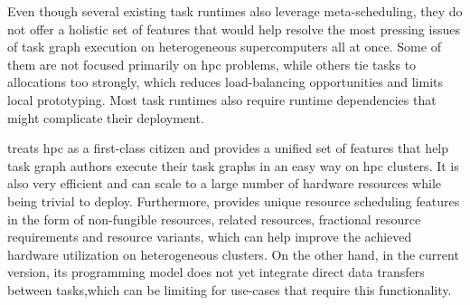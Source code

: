 Even though several existing task runtimes also leverage meta-scheduling, they do not offer a
holistic set of features that would help resolve the most pressing issues of task graph execution
on heterogeneous supercomputers all at once. Some of them are not focused primarily on
\gls{hpc} problems, while others tie tasks to allocations too strongly, which reduces
load-balancing opportunities and limits local prototyping. Most task runtimes also require runtime
dependencies that might complicate their deployment.

\hyperqueue{} treats \gls{hpc} as a first-class citizen and provides a
unified set of features that help task graph authors execute their task graphs in an easy way on
\gls{hpc} clusters. It is also very efficient and can scale to a large number of
hardware resources while being trivial to deploy. Furthermore, \hyperqueue{} provides
unique resource scheduling features in the form of non-fungible resources, related resources,
fractional resource requirements and resource variants, which can help improve the achieved
hardware utilization on heterogeneous clusters. On the other hand, in the current version, its
programming model does not yet integrate direct data transfers between tasks,which can be limiting
for use-cases that require this functionality.

